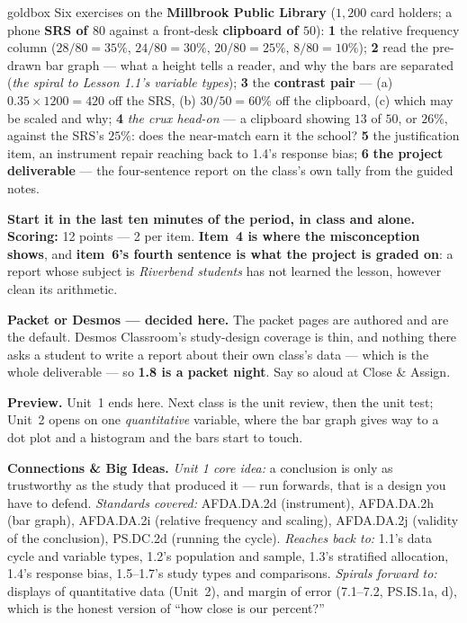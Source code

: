 \documentclass[10pt]{article}
\begin{document}
\boxguard
\begin{skillbox}{goldbox}
Six exercises on the \textbf{Millbrook Public Library} ($1{,}200$ card holders; a phone
\textbf{SRS of $80$} against a front-desk \textbf{clipboard of $50$}): \textbf{1} the relative
frequency column ($28/80 = 35\%$, $24/80 = 30\%$, $20/80 = 25\%$, $8/80 = 10\%$); \textbf{2} read
the pre-drawn bar graph --- what a height tells a reader, and why the bars are separated (\emph{the
spiral to Lesson 1.1's variable types}); \textbf{3} the \textbf{contrast pair} --- (a)
$0.35 \times 1200 = 420$ off the SRS, (b) $30/50 = 60\%$ off the clipboard, (c) which may be
scaled and why; \textbf{4} \emph{the crux head-on} --- a clipboard showing $13$ of $50$, or
$26\%$, against the SRS's $25\%$: does the near-match earn it the school? \textbf{5} the
justification item, an instrument repair reaching back to 1.4's response bias; \textbf{6}
\textbf{the project deliverable} --- the four-sentence report on the class's own tally from the
guided notes.

\textbf{Start it in the last ten minutes of the period, in class and alone.} \textbf{Scoring:}
12 points --- 2 per item. \textbf{Item~4 is where the misconception shows}, and \textbf{item~6's
fourth sentence is what the project is graded on}: a report whose subject is \emph{Riverbend
students} has not learned the lesson, however clean its arithmetic.

\textbf{Packet or Desmos --- decided here.} The packet pages are authored and are the default.
Desmos Classroom's study-design coverage is thin, and nothing there asks a student to write a
report about their own class's data --- which is the whole deliverable --- so \textbf{1.8 is a
packet night}. Say so aloud at Close \& Assign.

\textbf{Preview.} Unit~1 ends here. Next class is the unit review, then the unit test; Unit~2
opens on one \emph{quantitative} variable, where the bar graph gives way to a dot plot and a
histogram and the bars start to touch.

\textbf{Connections \& Big Ideas.} \textit{Unit 1 core idea:} a conclusion is only as trustworthy
as the study that produced it --- run forwards, that is a design you have to defend.
\textit{Standards covered:} AFDA.DA.2d (instrument), AFDA.DA.2h (bar graph), AFDA.DA.2i (relative
frequency and scaling), AFDA.DA.2j (validity of the conclusion), PS.DC.2d (running the cycle).
\textit{Reaches back to:} 1.1's data cycle and variable types, 1.2's population and sample, 1.3's
stratified allocation, 1.4's response bias, 1.5--1.7's study types and comparisons.
\textit{Spirals forward to:} displays of quantitative data (Unit~2), and margin of error
(7.1--7.2, PS.IS.1a, d), which is the honest version of ``how close is our percent?''
\end{skillbox}
\end{document}
